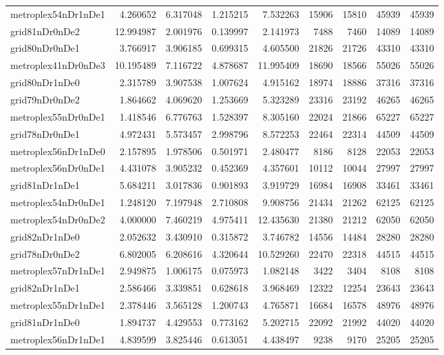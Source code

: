 \begin{longtable}{|l|r|r|r|r|r|r|r|r|}
metroplex54nDr1nDe1 & 4.260652 & 6.317048 & 1.215215 & 7.532263 & 15906 & 15810 & 45939 & 45939 \\
grid81nDr0nDe2 & 12.994987 & 2.001976 & 0.139997 & 2.141973 & 7488 & 7460 & 14089 & 14089 \\
grid80nDr0nDe1 & 3.766917 & 3.906185 & 0.699315 & 4.605500 & 21826 & 21726 & 43310 & 43310 \\
metroplex41nDr0nDe3 & 10.195489 & 7.116722 & 4.878687 & 11.995409 & 18690 & 18566 & 55026 & 55026 \\
grid80nDr1nDe0 & 2.315789 & 3.907538 & 1.007624 & 4.915162 & 18974 & 18886 & 37316 & 37316 \\
grid79nDr0nDe2 & 1.864662 & 4.069620 & 1.253669 & 5.323289 & 23316 & 23192 & 46265 & 46265 \\
metroplex55nDr0nDe1 & 1.418546 & 6.776763 & 1.528397 & 8.305160 & 22024 & 21866 & 65227 & 65227 \\
grid78nDr0nDe1 & 4.972431 & 5.573457 & 2.998796 & 8.572253 & 22464 & 22314 & 44509 & 44509 \\
metroplex56nDr1nDe0 & 2.157895 & 1.978506 & 0.501971 & 2.480477 & 8186 & 8128 & 22053 & 22053 \\
metroplex56nDr0nDe1 & 4.431078 & 3.905232 & 0.452369 & 4.357601 & 10112 & 10044 & 27997 & 27997 \\
grid81nDr1nDe1 & 5.684211 & 3.017836 & 0.901893 & 3.919729 & 16984 & 16908 & 33461 & 33461 \\
metroplex54nDr0nDe1 & 1.248120 & 7.197948 & 2.710808 & 9.908756 & 21434 & 21262 & 62125 & 62125 \\
metroplex54nDr0nDe2 & 4.000000 & 7.460219 & 4.975411 & 12.435630 & 21380 & 21212 & 62050 & 62050 \\
grid82nDr1nDe0 & 2.052632 & 3.430910 & 0.315872 & 3.746782 & 14556 & 14484 & 28280 & 28280 \\
grid78nDr0nDe2 & 6.802005 & 6.208616 & 4.320644 & 10.529260 & 22470 & 22318 & 44515 & 44515 \\
metroplex57nDr1nDe1 & 2.949875 & 1.006175 & 0.075973 & 1.082148 & 3422 & 3404 & 8108 & 8108 \\
grid82nDr1nDe1 & 2.586466 & 3.339851 & 0.628618 & 3.968469 & 12322 & 12254 & 23643 & 23643 \\
metroplex55nDr1nDe1 & 2.378446 & 3.565128 & 1.200743 & 4.765871 & 16684 & 16578 & 48976 & 48976 \\
grid81nDr1nDe0 & 1.894737 & 4.429553 & 0.773162 & 5.202715 & 22092 & 21992 & 44020 & 44020 \\
metroplex56nDr1nDe1 & 4.839599 & 3.825446 & 0.613051 & 4.438497 & 9238 & 9170 & 25205 & 25205 \\

\end{longtable}
